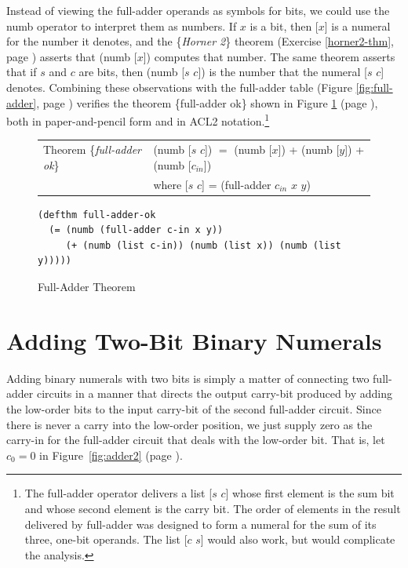 Instead of viewing the full-adder operands
as symbols for bits, we could use the numb operator
to interpret them as numbers.
If $x$ is a bit, then [$x$] is a numeral for
the number it denotes, and the \{\emph{Horner 2}\} theorem
(Exercise \ref{horner2-thm}, page \pageref{horner2-thm})
asserts that (numb [$x$]) computes that number.
The same theorem asserts that if $s$ and $c$ are bits,
then (numb [$s$ $c$]) is  the number that the numeral [$s$ $c$] denotes.
Combining these observations with the full-adder table
(Figure \ref{fig:full-adder}, page \pageref{fig:full-adder})
verifies the theorem \{full-adder ok\} shown in
Figure \ref{fig:full-adder-thm} (page \pageref{fig:full-adder-thm}),
both in paper-and-pencil form and in ACL2 notation.\footnote{The
full-adder operator delivers a list [$s$ $c$] whose first
element is the sum bit and whose second element is the carry bit.
The order of elements in the result delivered by full-adder was designed
to form a numeral for the sum of its three, one-bit operands.
The list [$c$ $s$] would also work,
but would complicate the analysis.}

\begin{figure}
\begin{center}
\begin{tabular}{ll}
Theorem \{\emph{full-adder ok}\} & (numb [$s$ $c$]) $=$ (numb [$x$]) + (numb [$y$]) + (numb [$c_{in}$]) \\
                                 & where [$s$ $c$] = (full-adder $c_{in}$ $x$ $y$) \\
\end{tabular}
\begin{Verbatim}
(defthm full-adder-ok
  (= (numb (full-adder c-in x y))
     (+ (numb (list c-in)) (numb (list x)) (numb (list y)))))
\end{Verbatim}
\end{center}
\caption{Full-Adder Theorem}
\label{fig:full-adder-thm}
\end{figure}

\section{Adding Two-Bit Binary Numerals}
\label{sec:adding-2-bit-numerals}

Adding binary numerals with two bits is simply a matter
of connecting two full-adder circuits in a manner that
directs the output carry-bit produced by adding the low-order bits
to the input carry-bit of the second full-adder circuit.
Since there is never a carry into the low-order position,
we just supply zero as the carry-in for the full-adder circuit
that deals with the low-order bit. That is, let
$c_0 = 0$ in Figure~\ref{fig:adder2} (page \pageref{fig:adder2}).

